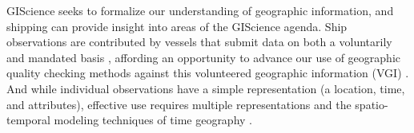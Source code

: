 \documentclass[12pt,letterpaper]{article}
\begin{document}
GIScience seeks to formalize our understanding of geographic information, and shipping can provide insight into areas of the GIScience agenda. Ship observations are contributed by vessels that submit data on both a voluntarily and mandated basis \citep{VOSClim,Tetreault2002}, affording an opportunity to advance our use of geographic quality checking methods \citep{goodchildli2012} against this volunteered geographic information (VGI) \citep{goodchild2007citizens}. And while individual observations have a simple representation (a location, time, and attributes), effective use requires multiple representations \citep{Goodchild1992} and the spatio-temporal modeling techniques of time geography \citep{miller2008field}.

\end{document}
